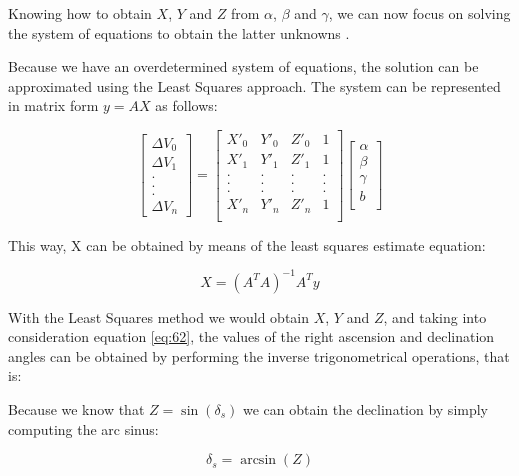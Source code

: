 Knowing how to obtain $X$, $Y$ and $Z$ from $\alpha$, $\beta$ and $\gamma$, we can now focus on solving the system of equations to obtain the latter unknowns .

Because we have an overdetermined system of equations, the solution can be approximated using the Least Squares approach. The system can be represented in matrix form $y = AX$ as follows:

\begin{equation} \label{eq:matrixSystem}
\begin{bmatrix}
\Delta V_{0} \\
\Delta V_{1} \\
. \\
. \\
. \\
\Delta V_{n}
\end{bmatrix}
=
\begin{bmatrix}
X'_{0} & Y'_{0} & Z'_{0} & 1 \\
X'_{1} & Y'_{1} & Z'_{1} & 1 \\
. & . & . & .\\
. & . & . & .\\
. & . & . & .\\
X'_{n} & Y'_{n} & Z'_{n} & 1 \\
\end{bmatrix}
\begin{bmatrix}
\alpha \\
\beta \\
\gamma \\
b \\
\end{bmatrix}
\end{equation}

This way, X can be obtained by means of the least squares estimate equation:

\begin{equation}\label{eq:mainEq}
	X = (A^{T}A)^{-1}A^{T}y
\end{equation}

With the Least Squares method we would obtain $X$, $Y$ and $Z$, and taking into consideration equation \ref{eq:62}, the values of the right ascension and declination angles can be obtained by performing the inverse trigonometrical operations, that is:

Because we know that $Z=\sin(\delta_{s})$ we can obtain the declination by simply computing the arc sinus:

\begin{equation} \label{eq:inverseTrigoTriennal}
\delta_{s} = \arcsin(Z)
\end{equation}

